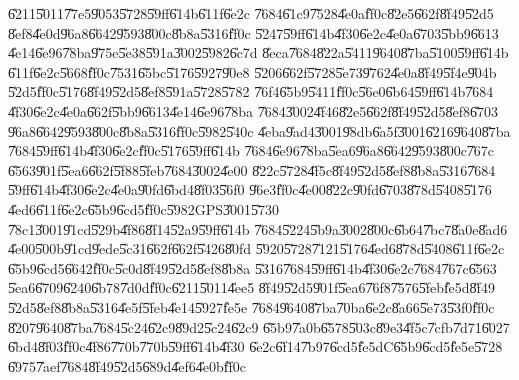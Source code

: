 \documentclass[12pt,a4paper]{article}
\begin{document}
\U{6211}\U{5011}\U{77e5}\U{9053}\U{5728}\U{59ff}\U{614b}\U{611f}\U{6e2c}%
\U{7684}\U{61c9}\U{7528}\U{4e0a}\U{ff0c}\U{82e5}\U{662f}\U{8f49}\U{52d5}%
\U{8ef8}\U{4e0d}\U{96a8}\U{6642}\U{9593}\U{800c}\U{8b8a}\U{5316}\U{ff0c}%
\U{5247}\U{59ff}\U{614b}\U{4f30}\U{6e2c}\U{4e0a}\U{6703}\U{5bb9}\U{6613}%
\U{4e14}\U{6e96}\U{78ba}\U{975e}\U{5e38}\U{591a}\U{3002}\U{5982}\U{6c7d}%
\U{8eca}\U{7684}\U{822a}\U{5411}\U{9640}\U{87ba}\U{5100}\U{59ff}\U{614b}%
\U{611f}\U{6e2c}\U{5668}\U{ff0c}\U{7531}\U{65bc}\U{5176}\U{5927}\U{90e8}%
\U{5206}\U{662f}\U{5728}\U{5e73}\U{9762}\U{4e0a}\U{8f49}\U{5f4e}\U{904b}%
\U{52d5}\U{ff0c}\U{5176}\U{8f49}\U{52d5}\U{8ef8}\U{591a}\U{5728}\U{5782}%
\U{76f4}\U{65b9}\U{5411}\U{ff0c}\U{56e0}\U{6b64}\U{59ff}\U{614b}\U{7684}%
\U{4f30}\U{6e2c}\U{4e0a}\U{662f}\U{5bb9}\U{6613}\U{4e14}\U{6e96}\U{78ba}%
\U{7684}\U{3002}\U{4f46}\U{82e5}\U{662f}\U{8f49}\U{52d5}\U{8ef8}\U{6703}%
\U{96a8}\U{6642}\U{9593}\U{800c}\U{8b8a}\U{5316}\U{ff0c}\U{5982}\U{540c}%
\U{4eba}\U{9ad4}\U{3001}\U{98db}\U{6a5f}\U{3001}\U{6216}\U{9640}\U{87ba}%
\U{7684}\U{59ff}\U{614b}\U{4f30}\U{6e2c}\U{ff0c}\U{5176}\U{59ff}\U{614b}%
\U{7684}\U{6e96}\U{78ba}\U{5ea6}\U{96a8}\U{6642}\U{9593}\U{800c}\U{767c}%
\U{6563}\U{901f}\U{5ea6}\U{662f}\U{5f88}\U{5feb}\U{7684}\U{3002}\U{4e00}%
\U{822c}\U{5728}\U{4f5c}\U{8f49}\U{52d5}\U{8ef8}\U{8b8a}\U{5316}\U{7684}%
\U{59ff}\U{614b}\U{4f30}\U{6e2c}\U{4e0a}\U{90fd}\U{6bd4}\U{8f03}\U{56f0}%
\U{96e3}\U{ff0c}\U{4e00}\U{822c}\U{90fd}\U{6703}\U{878d}\U{5408}\U{5176}%
\U{4ed6}\U{611f}\U{6e2c}\U{65b9}\U{6cd5}\U{ff0c}\U{5982}GPS\U{3001}\U{5730}%
\U{78c1}\U{3001}\U{91cd}\U{529b}\U{4f86}\U{8f14}\U{52a9}\U{59ff}\U{614b}%
\U{7684}\U{5224}\U{5b9a}\U{3002}\U{800c}\U{6b64}\U{7bc7}\U{8a0e}\U{8ad6}%
\U{4e00}\U{500b}\U{91cd}\U{9ede}\U{5c31}\U{662f}\U{662f}\U{5426}\U{80fd}%
\U{5920}\U{5728}\U{7121}\U{5176}\U{4ed6}\U{878d}\U{5408}\U{611f}\U{6e2c}%
\U{65b9}\U{6cd5}\U{6642}\U{ff0c}\U{5c0d}\U{8f49}\U{52d5}\U{8ef8}\U{8b8a}%
\U{5316}\U{7684}\U{59ff}\U{614b}\U{4f30}\U{6e2c}\U{7684}\U{767c}\U{6563}%
\U{5ea6}\U{6709}\U{6240}\U{6b78}\U{7d0d}\U{ff0c}\U{6211}\U{5011}\U{4ee5}%
\U{8f49}\U{52d5}\U{901f}\U{5ea6}\U{76f8}\U{7576}\U{5feb}\U{fe5d}\U{8f49}%
\U{52d5}\U{8ef8}\U{8b8a}\U{5316}\U{4e5f}\U{5feb}\U{4e14}\U{5927}\U{fe5e}%
\U{7684}\U{9640}\U{87ba}\U{70ba}\U{6e2c}\U{8a66}\U{5e73}\U{53f0}\U{ff0c}%
\U{8207}\U{9640}\U{87ba}\U{7684}\U{5c24}\U{62c9}\U{89d2}\U{5c24}\U{62c9}%
\U{65b9}\U{7a0b}\U{6578}\U{503c}\U{89e3}\U{4f5c}\U{7cfb}\U{7d71}\U{6027}%
\U{6bd4}\U{8f03}\U{ff0c}\U{4f86}\U{770b}\U{770b}\U{59ff}\U{614b}\U{4f30}%
\U{6e2c}\U{6f14}\U{7b97}\U{6cd5}\U{fe5d}C\U{65b9}\U{6cd5}\U{fe5e}\U{5728}%
\U{6975}\U{7aef}\U{7684}\U{8f49}\U{52d5}\U{689d}\U{4ef6}\U{4e0b}\U{ff0c}%
\end{document}

